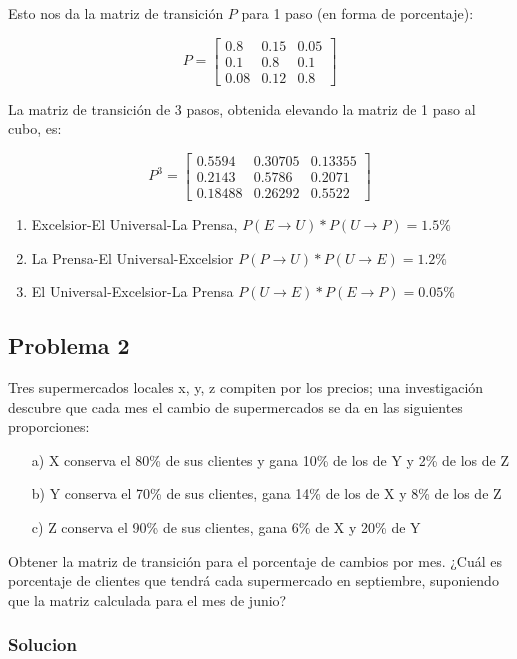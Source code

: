 \documentclass{article}
\begin{document}
Esto nos da la matriz de transición \(P\) para 1 paso (en forma de porcentaje):

\[ P = \begin{bmatrix} 0.8 & 0.15 & 0.05 \\ 0.1 & 0.8 & 0.1 \\ 0.08 & 0.12 & 0.8 \end{bmatrix} \]

La matriz de transición de 3 pasos, obtenida elevando la matriz de 1 paso al cubo, es:

\[ P^3 = \begin{bmatrix} 0.5594 & 0.30705 & 0.13355 \\ 0.2143 & 0.5786 & 0.2071 \\ 0.18488 & 0.26292 & 0.5522 \end{bmatrix} \]

\begin{enumerate}
    \item Excelsior-El Universal-La Prensa, $P(E \rightarrow U) * P(U \rightarrow P) = 1.5\%$
    \item La Prensa-El Universal-Excelsior $P(P \rightarrow U) * P(U \rightarrow E) = 1.2\%$
    \item El Universal-Excelsior-La Prensa $P(U \rightarrow E) * P(E \rightarrow P) = 0.05\%$
\end{enumerate}

\subsection*{Problema 2}

Tres supermercados locales x, y, z compiten por los precios; una investigación descubre que cada mes el cambio de supermercados se da en las siguientes proporciones:
\begin{itemize}
    \item[a)] X conserva el 80\% de sus clientes y gana 10\% de los de Y y 2\% de los de Z
    \item[b)] Y conserva el 70\% de sus clientes, gana 14\% de los de X y 8\% de los de Z
    \item[c)] Z conserva el 90\% de sus clientes, gana 6\% de X y 20\% de Y
\end{itemize}

Obtener la matriz de transición para el porcentaje de cambios por mes. ¿Cuál es porcentaje de clientes que tendrá cada supermercado en septiembre, suponiendo que la matriz calculada para el mes de junio?

\subsubsection*{Solucion}
\end{document}
